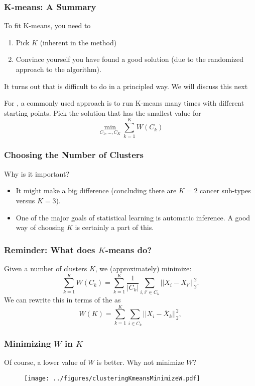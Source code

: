 \documentclass{beamer}
\begin{document}
\begin{frame}[fragile]
\frametitle{K-means: A Summary}
To fit K-means, you need to 
\begin{enumerate}
\item Pick $K$ (inherent in the method)
\item Convince yourself you have found a good solution (due to the randomized approach to the algorithm).
\end{enumerate}
\vsp

It turns out that  is difficult to do in a principled way.  We will discuss this next
\vsp

For , a commonly used approach is to run K-means many times with different starting points.  Pick the
solution that has the smallest value for 
\[
\min_{C_1,\ldots,C_K} \sum_{k=1}^K W(C_k)
\]
\end{frame}


\begin{frame}[fragile]
\frametitle{Choosing the Number of Clusters}
Why is it important?
\begin{itemize}
\item It might make a big difference (concluding there are $K = 2$ cancer sub-types versus
$K = 3$).
\item One of the major goals of statistical learning is automatic inference.  A good way of
choosing $K$ is certainly a part of this.
\end{itemize}
\end{frame}

\begin{frame}[fragile]
\frametitle{Reminder: What does $K$-means do?}
Given a number of clusters $K$, we (approximately) minimize:
\[
\sum_{k=1}^K W(C_k) 
= \sum_{k=1}^K\frac{1}{|C_k|} \sum_{i,i' \in C_k} ||X_i - X_{i'}||_2^2.
\]
We can rewrite this in terms of the  as
\[
W(K) = \sum_{k=1}^K  \sum_{i \in C_k}  ||X_i - \overline{X}_k||_2^2,
\]
\end{frame}

\begin{frame}[fragile]
\frametitle{Minimizing $W$ in $K$}
Of course, a lower value of $W$ is better.  Why not minimize $W$?

\begin{figure}[h!]
  \centering
  \texttt{[image: ../figures/clusteringKmeansMinimizeW.pdf]}
\end{figure}

\end{frame}
\end{document}

